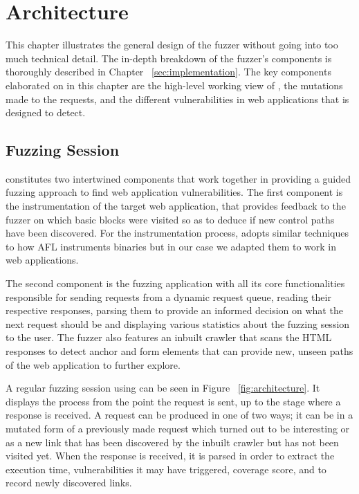 \chapter{Architecture}
\label{sec:architecture}
\minitoc
\vspace*{1cm}

This chapter illustrates the general design of the fuzzer without going into too much technical detail. The in-depth breakdown of the fuzzer's components is thoroughly described in Chapter ~\ref{sec:implementation}. The key components elaborated on in this chapter are the high-level working view of \pname{}, the mutations made to the requests, and the different vulnerabilities in web applications that \pname{} is designed to detect.

\section{Fuzzing Session}
\pname{} constitutes two intertwined components that work together in providing a guided fuzzing approach to find web application vulnerabilities. The first
component is the instrumentation of the target web application, that provides feedback to the fuzzer on which basic blocks were visited so as to deduce if new control paths have been discovered. For the instrumentation process, \pname{} adopts similar techniques to how AFL instruments binaries but in our case we adapted them to work in web applications. 

The second component is the fuzzing application with all its core functionalities responsible for sending requests from a dynamic request queue, reading their respective responses, parsing them to provide an informed decision on what the next request should be and displaying various statistics about the fuzzing session to the user. The fuzzer also features an inbuilt crawler that scans the HTML responses to detect anchor and form elements that can provide new, unseen paths of the web application to further explore.

A regular fuzzing session using \pname{} can be seen in Figure ~\ref{fig:architecture}. It displays the process from the point the request is sent, up to the stage where a response is received. A request can be produced in one of two ways; it can be in a mutated form of a previously made request which turned out to be interesting or as a new link that has been discovered by the inbuilt crawler but has not been visited yet. When the response is received, it is parsed in order to extract the execution time, vulnerabilities it may have triggered, coverage score, and to record newly discovered links.

